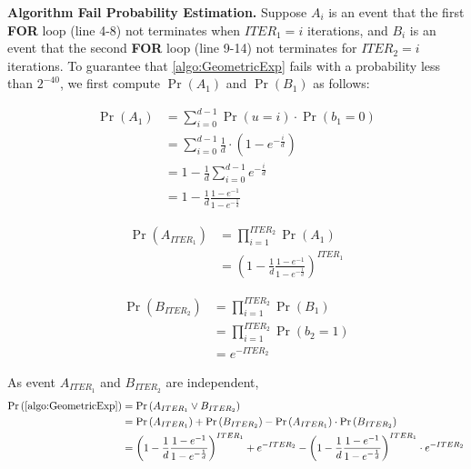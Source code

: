 \textbf{Algorithm Fail Probability Estimation.}
Suppose $A_i$ is an event that the first \textbf{FOR} loop (line 4-8) not terminates when $ITER_1=i$ iterations, and $B_i$ is an event that the second \textbf{FOR} loop (line 9-14) not terminates for $ITER_2=i$ iterations.
To guarantee that \autoref{algo:GeometricExp} fails with a probability less than $2^{-40}$, we first compute $\Pr\left(A_1\right)$ and $\Pr\left(B_1\right)$ as follows:



\begin{equation}
    \begin{split}
        \Pr\left(A_1\right) &= \sum_{i=0 }^{d-1}\Pr\left(u=i\right) \cdot \Pr\left(b_1=0\right) \\
        &= \sum_{i=0 }^{d-1}\frac{1}{d} \cdot \left(1-e^{-\frac{i}{d}}\right) \\
        &=1-\frac{1}{d}\sum_{i=0 }^{d-1}e^{-\frac{i}{d}}\\
        &=1-\frac{1}{d}\frac{1-e^{-1}}{1-e^{-\frac{1}{d}}}
    \end{split}
\end{equation}

\begin{equation}
    \begin{split}
        \Pr\left(A_{ITER_1}\right) &= \prod_{i=1}^{ITER_2}\Pr\left(A_1\right) \\
        &=\left(1-\frac{1}{d}\frac{1-e^{-1}}{1-e^{-\frac{1}{d}}}\right) ^{ITER_1}
    \end{split}
\end{equation}

\begin{equation}
    \begin{split}
        \Pr\left(B_{ITER_2}\right) &= \prod_{i=1}^{ITER_2}\Pr\left(B_1\right) \\
        &= \prod_{i=1}^{ITER_2}\Pr\left(b_2=1\right) \\
        &=e^{- ITER_2 }
    \end{split}
\end{equation}

As event $A_{ITER_1}$ and $B_{ITER_2}$ are independent,
\begin{equation}
    \begin{split}
        \Pr\left(\autoref{algo:GeometricExp}\right)  &=\Pr\left(A_{ITER_1}\lor B_{ITER_2} \right)\\
        &= \Pr\left(A_{ITER_1} \right)+   \Pr\left(B_{ITER_2}\right)-\Pr\left(A_{ITER_1} \right)\cdot   \Pr\left(B_{ITER_2}\right)\\
        &=\left(1-\frac{1}{d}\frac{1-e^{-1}}{1-e^{-\frac{1}{d}}}\right) ^{ITER_1} + e^{- ITER_2 }-\left(1-\frac{1}{d}\frac{1-e^{-1}}{1-e^{-\frac{1}{d}}}\right) ^{ITER_1} \cdot e^{- ITER_2 }
    \end{split}
\end{equation}

